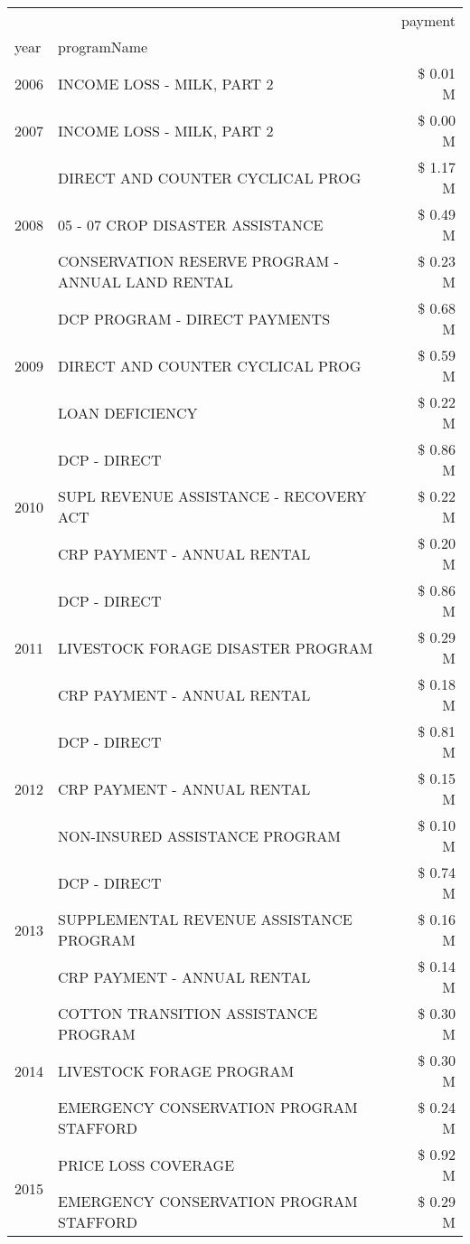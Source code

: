\begin{tabular}{llr}
\toprule
 &  & payment \\
year & programName &  \\
\midrule
2006 & INCOME LOSS - MILK, PART 2 & \$ 0.01 M \\
\cline{1-3}
2007 & INCOME LOSS - MILK, PART 2 & \$ 0.00 M \\
\cline{1-3}
\multirow[t]{3}{*}{2008} & DIRECT AND COUNTER CYCLICAL PROG & \$ 1.17 M \\
 & 05 - 07 CROP DISASTER ASSISTANCE & \$ 0.49 M \\
 & CONSERVATION RESERVE PROGRAM - ANNUAL LAND RENTAL & \$ 0.23 M \\
\cline{1-3}
\multirow[t]{3}{*}{2009} & DCP PROGRAM - DIRECT PAYMENTS & \$ 0.68 M \\
 & DIRECT AND COUNTER CYCLICAL PROG & \$ 0.59 M \\
 & LOAN DEFICIENCY & \$ 0.22 M \\
\cline{1-3}
\multirow[t]{3}{*}{2010} & DCP - DIRECT & \$ 0.86 M \\
 & SUPL REVENUE ASSISTANCE - RECOVERY ACT & \$ 0.22 M \\
 & CRP PAYMENT - ANNUAL RENTAL & \$ 0.20 M \\
\cline{1-3}
\multirow[t]{3}{*}{2011} & DCP - DIRECT & \$ 0.86 M \\
 & LIVESTOCK FORAGE DISASTER PROGRAM & \$ 0.29 M \\
 & CRP PAYMENT - ANNUAL RENTAL & \$ 0.18 M \\
\cline{1-3}
\multirow[t]{3}{*}{2012} & DCP - DIRECT & \$ 0.81 M \\
 & CRP PAYMENT - ANNUAL RENTAL & \$ 0.15 M \\
 & NON-INSURED ASSISTANCE PROGRAM & \$ 0.10 M \\
\cline{1-3}
\multirow[t]{3}{*}{2013} & DCP - DIRECT & \$ 0.74 M \\
 & SUPPLEMENTAL REVENUE ASSISTANCE PROGRAM & \$ 0.16 M \\
 & CRP PAYMENT - ANNUAL RENTAL & \$ 0.14 M \\
\cline{1-3}
\multirow[t]{3}{*}{2014} & COTTON TRANSITION ASSISTANCE PROGRAM & \$ 0.30 M \\
 & LIVESTOCK FORAGE PROGRAM & \$ 0.30 M \\
 & EMERGENCY CONSERVATION PROGRAM STAFFORD & \$ 0.24 M \\
\cline{1-3}
\multirow[t]{3}{*}{2015} & PRICE LOSS COVERAGE & \$ 0.92 M \\
 & EMERGENCY CONSERVATION PROGRAM STAFFORD & \$ 0.29 M \\

\end{tabular}
